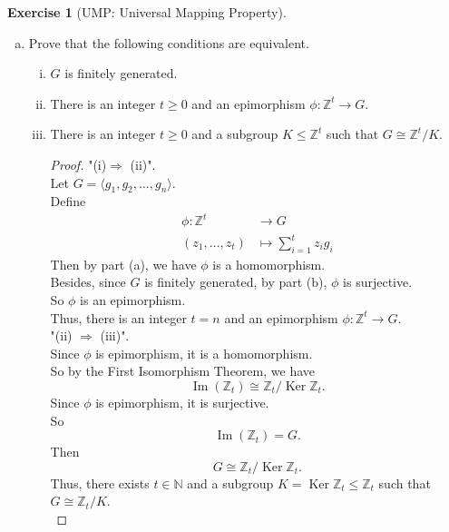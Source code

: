 \documentclass{amsart}
\newcommand{\bbz}{\mathbb{Z}}
\newcommand{\bbn}{\mathbb{N}}
\renewcommand{\ker}{\operatorname{Ker}}
\newcommand{\im}{\operatorname{Im}}
\theoremstyle{plain}
\theoremstyle{definition}
\newtheorem{exer}[lem]{Exercise}
\begin{document}
\begin{exer}[UMP: Universal Mapping Property]
\begin{enumerate}[(a)]
\begin{proof}
	Then we have
	\[g = \phi (f) = \sum_{i=1}^tg_i{f_i} \in \langle g_1,g_2,\ldots,g_t\rangle,\]
	which is contradicted by the other assumption that $g \not\in \langle g_1,g_2,\ldots,g_t\rangle$.\\
	Thus, if $g \in G$, then $g \in \langle g_1,g_2,\ldots,g_t\rangle$.\\
	Namely, $G \subset \langle g_1,g_2,\ldots,g_t\rangle = \im(\phi)$.\\
	Besides, $\im(\phi) \subset G$ by the definition of $\phi$.\\
	Therefore,
	\[G = \im(\phi) = \langle g_1,g_2,\ldots,g_t\rangle.\]
	In summary, $\phi$ is surjective if and only if $G=\langle g_1,\ldots,g_t\rangle$.
\end{proof}


\item 
Prove that the following conditions are equivalent.
\begin{enumerate}[(i)]
\item $G$ is finitely generated.
\item 
There is an integer $t\geq 0$ and an epimorphism $\phi\colon\bbz^t\to G$.
\item There is an integer $t\geq 0$ and a subgroup $K\leq\bbz^t$ such that $G\cong\bbz^t/K$.
\begin{proof}
  "(i)$\Rightarrow$ (ii)".\\
  Let $G = \langle g_1,g_2,\ldots,g_n\rangle$.\\
  Define 
  \begin{align*}
	\phi: \bbz^t &\to G \\
  	(z_1,\ldots,z_t) &\mapsto \sum_{i=1}^tz_ig_i 
  \end{align*}
  Then by part (a), we have $\phi$ is a homomorphism.\\
  Besides, since $G$ is finitely generated, by part (b), $\phi$ is surjective.\\
  So $\phi$ is an epimorphism.\\
  Thus, there is an integer $t= n$ and an epimorphism $\phi:\bbz^t \to G$.\\
  "(ii) $\Rightarrow$ (iii)".\\
  	Since $\phi$ is epimorphism, it is a homomorphism. \\
	So by the First Isomorphism Theorem, we have
	\[\im(\bbz_t) \cong \bbz_t/\ker{\bbz_t}.\]
	Since $\phi$ is epimorphism, it is surjective.\\
	So 
	\[\im(\bbz_t) = G.\]
	Then
	\[G \cong \bbz_t/\ker{\bbz_t}.\]
  	Thus, there exists $t \in \bbn$ and a subgroup $K = \ker{\bbz_t} \leq \bbz_t$ such that $G \cong \bbz_t/K$.\\

\end{proof}
\end{enumerate}
\end{enumerate}
\end{exer}
\end{document}
